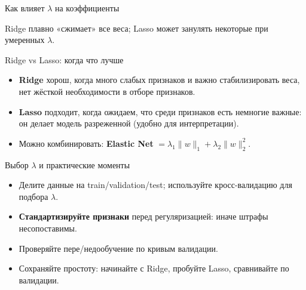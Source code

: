 \documentclass[11pt,aspectratio=169]{beamer}
\begin{document}
\begin{frame}{Как влияет $\lambda$ на коэффициенты}
	\vspace{2pt}
	\footnotesize Ridge плавно «сжимает» все веса; Lasso может занулять некоторые при умеренных $\lambda$.
\end{frame}

\begin{frame}{Ridge vs Lasso: когда что лучше}
	\small
	\begin{itemize}
		\item \textbf{Ridge} хорош, когда много слабых признаков и важно стабилизировать веса, нет жёсткой необходимости в отборе признаков.
		\item \textbf{Lasso} подходит, когда ожидаем, что среди признаков есть немногие важные: он делает модель разреженной (удобно для интерпретации).
		\item Можно комбинировать: \textbf{Elastic Net} $= \lambda_1\lVert w\rVert_1 + \lambda_2\lVert w\rVert_2^2$.
	\end{itemize}
\end{frame}

\begin{frame}{Выбор $\lambda$ и практические моменты}
	\small
	\begin{itemize}
		\item Делите данные на train/validation/test; используйте кросс-валидацию для подбора $\lambda$.
		\item \textbf{Стандартизируйте признаки} перед регуляризацией: иначе штрафы несопоставимы.
		\item Проверяйте пере/недообучение по кривым валидации.
		\item Сохраняйте простоту: начинайте с Ridge, пробуйте Lasso, сравнивайте по валидации.
	\end{itemize}
\end{frame}
\end{document}
